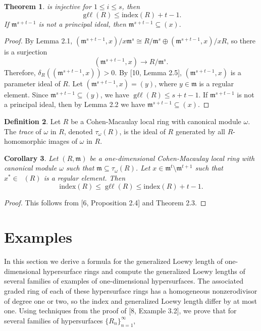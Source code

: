 \documentclass{amsart}
\newtheorem{theorem}{Theorem}[section]
\newtheorem{corollary}[theorem]{Corollary}
\theoremstyle{definition}
\theoremstyle{definition}
\newtheorem{definition}[theorem]{Definition}
\DeclareMathOperator{\gr}{\text{gr}_{\mathfrak{m}}}
\DeclareMathOperator{\gll}{\text{g}\ell\ell}
\numberwithin{equation}{section}
\theoremstyle{definition}
\begin{document}
{\begin{theorem}
is injective for $1 \leq i \leq s$, then \[\gll(R) \leq \text{index}(R)+t-1.\] \text{} \newline If $\mathfrak{m}^{s+t-1}$ is not a principal ideal, then $\mathfrak{m}^{s+t-1} \subseteq (x).$
\end{theorem}\text{}
\begin{proof} By Lemma 2.1, $(\mathfrak{m}^{s+t-1},x)/x\mathfrak{m}^{s} \cong R/\mathfrak{m}^{s} \oplus (\mathfrak{m}^{s+t-1},x)/xR$, so there is a surjection 
\[
(\mathfrak{m}^{s+t-1},x) \longrightarrow R/\mathfrak{m}^{s}.
\]Therefore, $\delta_{R}((\mathfrak{m}^{s+t-1},x))>0$. By [10, Lemma 2.5], $(\mathfrak{m}^{s+t-1},x)$ is a parameter ideal of $R$. Let $(\mathfrak{m}^{s+t-1},x)=(y)$, where $y \in \mathfrak{m}$ is a regular element. Since $\mathfrak{m}^{s+t-1} \subseteq (y)$, we have $\gll(R) \leq s+t-1$. If $\mathfrak{m}^{s+t-1}$ is not a principal ideal, then by Lemma 2.2 we have $\mathfrak{m}^{s+t-1} \subseteq (x)$. \end{proof}\text{} 
\begin{definition}
Let $R$ be a Cohen-Macaulay local ring with canonical module $\omega$. The {\it{trace}} of $\omega$ in $R$, denoted $\tau_{\omega}(R)$, is the ideal of $R$ generated by all $R$-homomorphic images of $\omega$ in $R$. 
\end{definition}\text{} 
\begin{corollary} Let $(R,\mathfrak{m})$ be a one-dimensional Cohen-Macaulay local ring with canonical module $\omega$ such that $\mathfrak{m} \subseteq \tau_{\omega}(R)$. Let $x \in \mathfrak{m}^{t} \setminus \mathfrak{m}^{t+1}$ such that $x^{*} \in \gr(R)$ is a regular element. Then \[\text{index}(R) \leq \gll(R) \leq \text{index}(R)+t-1.\]\end{corollary}\begin{proof} This follows from [6, Proposition 2.4] and Theorem 2.3. \end{proof} \section{\large{Examples}} In this section we derive a formula for the generalized Loewy length of one-dimensional hypersurface rings and compute the generalized Loewy lengths of several families of examples of one-dimensional hypersurfaces. The associated graded ring of each of these hypersurface rings has a homogeneous nonzerodivisor of degree one or two, so the index and generalized Loewy length differ by at most one. \newline\newline Using techniques from the proof of [8, Example 3.2], we prove that for several families of hypersurfaces $\{R_{n}\}_{n=1}^{\infty}$,  
}
\end{document}
